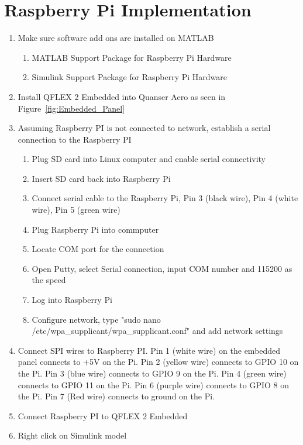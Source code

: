 \section{Raspberry Pi Implementation}
\label{sec:RPItut}
\begin{enumerate}
    \item Make sure software add ons are installed on MATLAB
    \begin{enumerate}
        \item MATLAB Support Package for Raspberry Pi Hardware
        \item Simulink Support Package for Raspberry Pi Hardware
    \end{enumerate}
    \item Install QFLEX 2 Embedded into Quanser Aero as seen in Figure~\ref{fig:Embedded_Panel}
    \item Assuming Raspberry PI is not connected to network, establish a serial connection to the Raspberry PI
    \begin{enumerate}
	\item Plug SD card into Linux computer and enable serial connectivity
   	\item Insert SD card back into Raspberry Pi
	\item Connect serial cable to the Raspberry Pi, Pin 3 (black wire), Pin 4 (white wire), Pin 5 (green wire)
	\item Plug Raspberry Pi into commputer
	\item Locate COM port for the connection
	\item Open Putty, select Serial connection, input COM number and 115200 as the speed
	\item Log into Raspberry Pi
	\item Configure network, type "sudo nano /etc/wpa\_supplicant/wpa\_supplicant.conf" and add network settings
    \end{enumerate}
    \item Connect SPI wires to Raspberry PI. Pin 1 (white wire) on the embedded panel connects to +5V on the Pi.  Pin 2 (yellow wire) connects to GPIO 10 on the Pi. Pin 3 (blue wire) connects to GPIO 9 on the Pi.  Pin 4 (green wire) connects to GPIO 11 on the Pi. Pin 6 (purple wire) connects to GPIO 8 on the Pi.  Pin 7 (Red wire) connects to ground on the Pi.
    \item Connect Raspberry PI to QFLEX 2 Embedded
    \item Right click on Simulink model

\end{enumerate}
